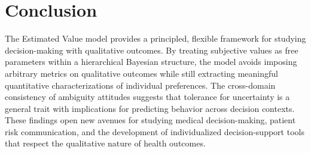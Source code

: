 \documentclass[12pt]{article}
\begin{document}
\section{Conclusion}

The Estimated Value model provides a principled, flexible framework for studying decision-making with qualitative outcomes. By treating subjective values as free parameters within a hierarchical Bayesian structure, the model avoids imposing arbitrary metrics on qualitative outcomes while still extracting meaningful quantitative characterizations of individual preferences. The cross-domain consistency of ambiguity attitudes suggests that tolerance for uncertainty is a general trait with implications for predicting behavior across decision contexts. These findings open new avenues for studying medical decision-making, patient risk communication, and the development of individualized decision-support tools that respect the qualitative nature of health outcomes.



\end{document}
